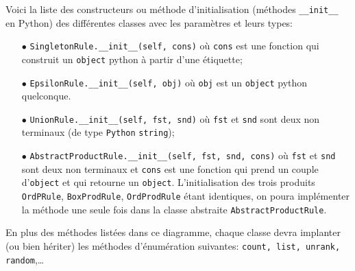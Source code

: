 \documentclass[11pt]{article}
\newcommand{\Python}{\texttt{Python}}
\begin{document}
\begin{center}
\end{center}
\smallskip



Voici la liste des constructeurs ou méthode d'initialisation (méthodes
\verb+__init__+ en Python) des différentes classes avec les paramètres et
leurs types:
\medskip

\begin{itemize}
\item[$\bullet$] \verb+SingletonRule.__init__(self, cons)+ où \texttt{cons} est
  une fonction qui construit un \texttt{object} python à partir d'une
  étiquette;
\medskip
\item[$\bullet$] \verb+EpsilonRule.__init__(self, obj)+ où \texttt{obj} est un
  \texttt{object} python quelconque.
\medskip
\item[$\bullet$] \verb+UnionRule.__init__(self, fst, snd)+ où \texttt{fst} et
  \texttt{snd} sont deux non terminaux (de type \Python{} \texttt{string});
\medskip
\item[$\bullet$] \verb+AbstractProductRule.__init__(self, fst, snd, cons)+ où
  \texttt{fst} et \texttt{snd} sont deux non terminaux et \texttt{cons} est
  une fonction qui prend un couple d'\texttt{object} et qui retourne un
  \texttt{object}. L'initialisation des trois produits \verb+OrdPRule+,
  \verb+BoxProdRule+, \verb+OrdProdRule+ étant
  identiques, on poura implémenter la méthode une seule fois dans la classe
  abstraite \verb+AbstractProductRule+.
\medskip
\end{itemize}
En plus des méthodes listées dans ce diagramme, chaque classe devra implanter
(ou bien hériter) les méthodes d'énumération suivantes: \texttt{count, list,
  unrank, random},\dots
  
\end{document}

